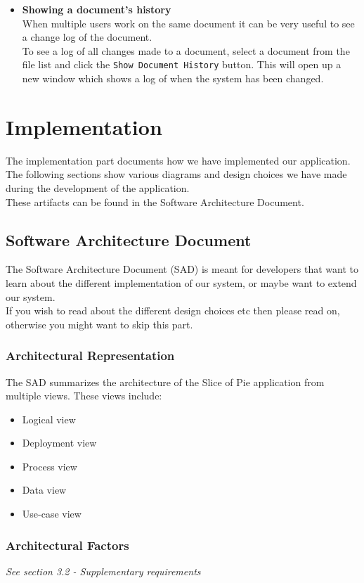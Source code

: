 \documentclass[11pt]{article}
\begin{document}
\begin{itemize}
\item \textbf{Showing a document's history} \\
\label{sec-3-4-2-5}%
When multiple users work on the same document it can be very useful to see a change log of the document. \\
To see a log of all changes made to a document, select a document from the file list and click the \texttt{Show Document History} button. This will open up a new window which shows a log of when the system has been changed.
\newpage
\end{itemize} %
\section{Implementation}
\label{sec-4}
The implementation part documents how we have implemented our application. \\
The following sections show various diagrams and design choices we have made during the development of the application. \\
These artifacts can be found in the Software Architecture Document.
\subsection{Software Architecture Document}
\label{sec-4-1}
The Software Architecture Document (SAD) is meant for developers that want to learn about the different implementation of our system, or maybe want to extend our system. \\
If you wish to read about the different design choices etc then please read on, otherwise you might want to skip this part.
\subsubsection{Architectural Representation}
\label{sec-4-1-1}

The SAD summarizes the architecture of the Slice of Pie application from multiple views. These views include:
\begin{itemize}
\item Logical view
\item Deployment view
\item Process view
\item Data view
\item Use-case view
\end{itemize}
\subsubsection{Architectural Factors}
\label{sec-4-1-2}
\emph{See section 3.2 - Supplementary requirements}
\end{document}
